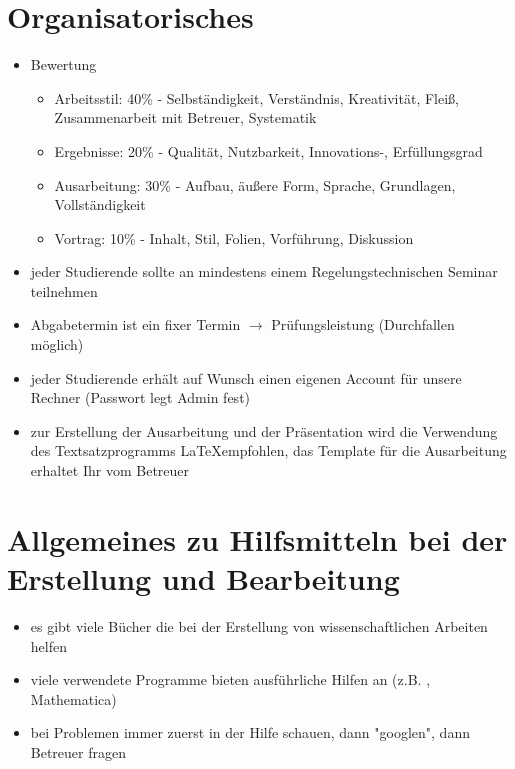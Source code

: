 \section*{Organisatorisches}
\label{sec:Organisatorisches}
\begin{itemize}
	\item Bewertung
	\begin{itemize}
		\item Arbeitsstil: 40\% - Selbständigkeit, Verständnis, Kreativität, Fleiß, Zusammenarbeit mit Betreuer, Systematik
		\item Ergebnisse: 20\% - Qualität, Nutzbarkeit, Innovations-, Erfüllungsgrad
		\item Ausarbeitung: 30\% - Aufbau, äußere Form, Sprache, Grundlagen, Vollständigkeit
		\item Vortrag: 10\% - Inhalt, Stil, Folien, Vorführung, Diskussion
	\end{itemize}
	\item jeder Studierende sollte an mindestens einem Regelungstechnischen Seminar teilnehmen
	\item Abgabetermin ist ein fixer Termin $\rightarrow$ Prüfungsleistung (Durchfallen möglich)
	\item jeder Studierende erhält auf Wunsch einen eigenen Account für unsere Rechner (Passwort legt Admin fest)
	\item zur Erstellung der Ausarbeitung und der Präsentation wird die Verwendung des Textsatzprogramms \LaTeX empfohlen, das Template für die Ausarbeitung erhaltet Ihr vom Betreuer
\end{itemize}


\section*{Allgemeines zu Hilfsmitteln bei der Erstellung und Bearbeitung}
\label{sec:Allgemeines}
\begin{itemize}
	\item es gibt viele Bücher die bei der Erstellung von wissenschaftlichen Arbeiten helfen
	\item viele verwendete Programme bieten ausführliche Hilfen an (z.B. \Matlab, Mathematica)
	\item bei Problemen immer zuerst in der Hilfe schauen, dann "googlen", dann Betreuer fragen
\end{itemize}


